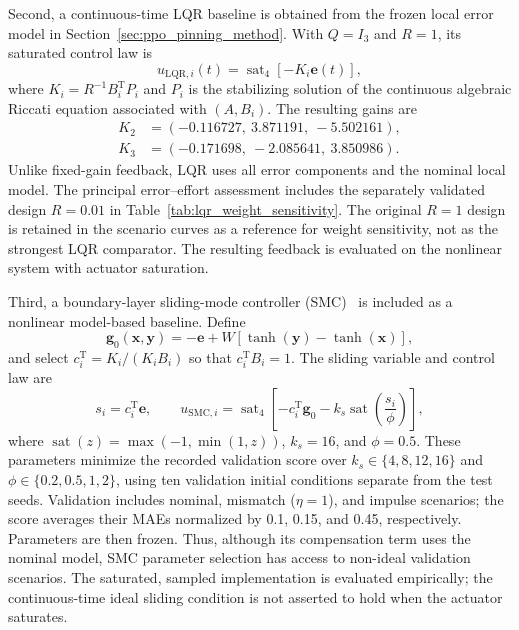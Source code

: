 \documentclass[a4paper,fleqn]{cas-sc}
\theoremstyle{plain}
\theoremstyle{definition}
\begin{document}
Second, a continuous-time LQR baseline is obtained from the frozen local error model in Section~\ref{sec:ppo_pinning_method}. With $Q=I_3$ and $R=1$, its saturated control law is
\begin{equation}
	u_{\mathrm{LQR},i}(t)=\operatorname{sat}_{4}\!\left[-K_i\mathbf e(t)\right],
	\label{eq:lqr_baseline}
\end{equation}
where $K_i=R^{-1}B_i^{\mathrm T}P_i$ and $P_i$ is the stabilizing solution of the continuous algebraic Riccati equation associated with $(A,B_i)$. The resulting gains are
\[
\begin{aligned}
K_2&=(-0.116727,\ 3.871191,\ -5.502161),\\
K_3&=(-0.171698,\ -2.085641,\ 3.850986).
\end{aligned}
\]
Unlike fixed-gain feedback, LQR uses all error components and the nominal local model. The principal error--effort assessment includes the separately validated design $R=0.01$ in Table~\ref{tab:lqr_weight_sensitivity}. The original $R=1$ design is retained in the scenario curves as a reference for weight sensitivity, not as the strongest LQR comparator. The resulting feedback is evaluated on the nonlinear system with actuator saturation.

Third, a boundary-layer sliding-mode controller (SMC)~\cite{feki2009sliding,su2021fixed} is included as a nonlinear model-based baseline. Define
\begin{equation}
	\mathbf g_0(\mathbf x,\mathbf y)=-\mathbf e+W\left[\tanh(\mathbf y)-\tanh(\mathbf x)\right],
	\label{eq:nominal_error_drift}
\end{equation}
and select $c_i^{\mathrm T}=K_i/(K_iB_i)$ so that $c_i^{\mathrm T}B_i=1$. The sliding variable and control law are
\begin{equation}
	s_i=c_i^{\mathrm T}\mathbf e,\qquad
	u_{\mathrm{SMC},i}=\operatorname{sat}_{4}\!\left[-c_i^{\mathrm T}\mathbf g_0-k_s\operatorname{sat}\!\left(\frac{s_i}{\phi}\right)\right],
	\label{eq:smc_baseline}
\end{equation}
where $\operatorname{sat}(z)=\max(-1,\min(1,z))$, $k_s=16$, and $\phi=0.5$. These parameters minimize the recorded validation score over $k_s\in\{4,8,12,16\}$ and $\phi\in\{0.2,0.5,1,2\}$, using ten validation initial conditions separate from the test seeds. Validation includes nominal, mismatch ($\eta=1$), and impulse scenarios; the score averages their MAEs normalized by 0.1, 0.15, and 0.45, respectively. Parameters are then frozen. Thus, although its compensation term uses the nominal model, SMC parameter selection has access to non-ideal validation scenarios. The saturated, sampled implementation is evaluated empirically; the continuous-time ideal sliding condition is not asserted to hold when the actuator saturates.
\end{document}
